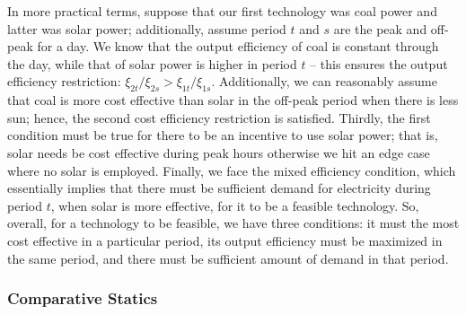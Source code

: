 \documentclass[12pt,a4paper]{extarticle}
\begin{document}
In more practical terms, suppose that our first technology was coal power and latter was solar power; additionally, assume period $t$ and $s$ are the peak and off-peak for a day. We know that the output efficiency of coal is constant through the day, while that of solar power is higher in period $t$ -- this ensures the output efficiency restriction: $\xi_{2t}/\xi_{2s} > \xi_{1t}/\xi_{1s}$. Additionally, we can reasonably assume that coal is more cost effective than solar in the off-peak period when there is less sun; hence, the second cost efficiency restriction is satisfied. Thirdly, the first condition must be true for there to be an incentive to use solar power; that is, solar needs be cost effective during peak hours otherwise we hit an edge case where no solar is employed. Finally, we face the mixed efficiency condition, which essentially implies that there must be sufficient demand for electricity during period $t$, when solar is more effective, for it to be a feasible technology. So, overall, for a technology to be feasible, we have three conditions: it must the most cost effective in a particular period, its output efficiency must be maximized in the same period, and there must be sufficient amount of demand in that period. 



\subsubsection{Comparative Statics}
\end{document}

